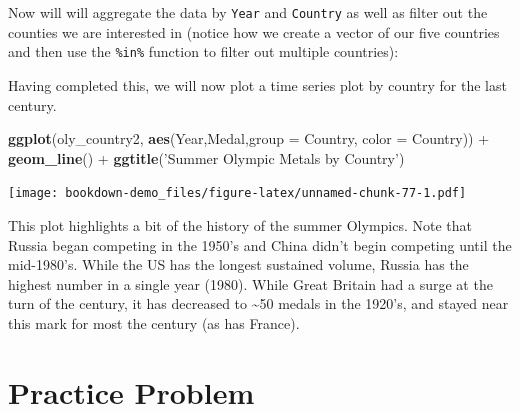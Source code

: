 \documentclass[]{book}
\newenvironment{Shaded}{\begin{snugshade}}{\end{snugshade}}
\newcommand{\KeywordTok}[1]{\textcolor[rgb]{0.13,0.29,0.53}{\textbf{{#1}}}}
\newcommand{\DataTypeTok}[1]{\textcolor[rgb]{0.13,0.29,0.53}{{#1}}}
\newcommand{\StringTok}[1]{\textcolor[rgb]{0.31,0.60,0.02}{{#1}}}
\newcommand{\NormalTok}[1]{{#1}}
\begin{document}
Now will will aggregate the data by \texttt{Year} and \texttt{Country}
as well as filter out the counties we are interested in (notice how we
create a vector of our five countries and then use the \texttt{\%in\%}
function to filter out multiple countries):

\begin{Shaded}
\end{Shaded}

Having completed this, we will now plot a time series plot by country
for the last century.

\begin{Shaded}
\begin{Highlighting}[]
\KeywordTok{ggplot}\NormalTok{(oly_country2, }\KeywordTok{aes}\NormalTok{(Year,Medal,}\DataTypeTok{group =} \NormalTok{Country, }\DataTypeTok{color =} \NormalTok{Country)) +}\StringTok{ }\KeywordTok{geom_line}\NormalTok{() +}\StringTok{ }\KeywordTok{ggtitle}\NormalTok{(}\StringTok{'Summer Olympic Metals by Country'}\NormalTok{)}
\end{Highlighting}
\end{Shaded}

\texttt{[image: bookdown-demo\_files/figure-latex/unnamed-chunk-77-1.pdf]}

This plot highlights a bit of the history of the summer Olympics. Note
that Russia began competing in the 1950's and China didn't begin
competing until the mid-1980's. While the US has the longest sustained
volume, Russia has the highest number in a single year (1980). While
Great Britain had a surge at the turn of the century, it has decreased
to \textasciitilde{}50 medals in the 1920's, and stayed near this mark
for most the century (as has France).

\section{Practice Problem}\label{practice-problem-2}
\end{document}
